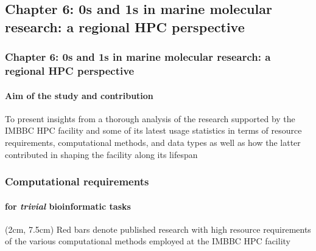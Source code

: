 \documentclass{beamer}
\begin{document}
   \begin{darkframes}
      \section{\textbf{Chapter 6:} 0s and 1s in marine molecular
      research: a regional HPC perspective}

      \begin{frame}
         \frametitle{\textbf{Chapter 6:} 0s and 1s in marine molecular research: a regional HPC perspective}
         \framesubtitle{Aim of the study and contribution}

         To present insights from a thorough analysis of the research supported by
         the IMBBC HPC facility and some of its latest usage statistics in terms of resource requirements, 
         computational methods, and data types as well as how the latter contributed in shaping the facility
         along its lifespan
         
      \end{frame}

   \end{darkframes}

   \begin{frame}

      \frametitle{Computational requirements}
      \framesubtitle{for \textit{trivial} bioinformatic tasks}


      \begin{textblock*}{10cm}(2cm, 7.5cm)
            \scriptsize Red bars denote published research with high resource requirements \\
            \scriptsize of the various computational methods employed at the IMBBC HPC facility
      \end{textblock*}


   \end{frame}
\end{document}
